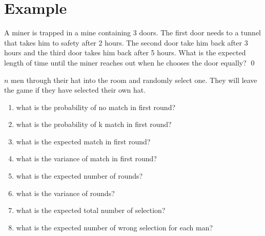 \section{Example}

\begin{example}
    A miner is trapped in a mine containing 3 doors. The first door needs to a tunnel that takes him to safety after 2 hours. The second door take him back after 3 hours and the third door takes him back after 5 hours. What is the expected length of time until the miner reaches out when he chooses the door equally?    
    \qed
\end{example}

\begin{example}
    $n$ men through their hat into the room and randomly select one. They will leave the game if they have selected their own hat.
    \begin{enumerate}
        \item \label{hatq1} what is the probability of no match in first round?
        \item \label{hatq2} what is the probability of k match in first round?
        \item \label{hatq3} what is the expected match in first round?
        \item \label{hatq4} what is the variance of match in first round?
        \item \label{hatq5} what is the expected number of rounds?
        \item \label{hatq6} what is the variance of rounds?
        \item \label{hatq7} what is the expected total number of selection?
        \item \label{hatq8} what is the expected number of wrong selection for each man?
    \end{enumerate}    
\end{example}
